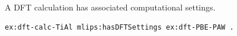 A DFT calculation has associated computational settings.
\begin{lstlisting}[language=turtle]
ex:dft-calc-TiAl mlips:hasDFTSettings ex:dft-PBE-PAW .
\end{lstlisting}
